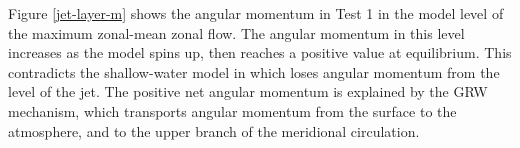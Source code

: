 
Figure \ref{jet-layer-m} shows the angular momentum in Test 1 in the model level of the maximum zonal-mean zonal flow. The angular momentum in this level increases as the model spins up, then reaches a positive value at equilibrium. This contradicts the shallow-water model in \citet{showman2011superrotation} which loses angular momentum from the level of the jet. The positive net angular momentum is explained by the GRW mechanism, which transports angular momentum from the surface to the atmosphere, and to the upper branch of the meridional circulation.

